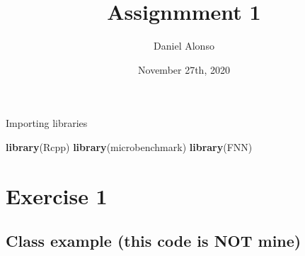 \documentclass[]{article}
\title{Assignmment 1}
\author{Daniel Alonso}
\date{November 27th, 2020}
\newenvironment{Shaded}{\begin{snugshade}}{\end{snugshade}}
\newcommand{\KeywordTok}[1]{\textcolor[rgb]{0.13,0.29,0.53}{\textbf{#1}}}
\newcommand{\NormalTok}[1]{#1}
\begin{document}
\maketitle

Importing libraries

\begin{Shaded}
\begin{Highlighting}[]
\KeywordTok{library}\NormalTok{(Rcpp)}
\KeywordTok{library}\NormalTok{(microbenchmark)}
\KeywordTok{library}\NormalTok{(FNN)}
\end{Highlighting}
\end{Shaded}

\hypertarget{exercise-1}{%
\section{Exercise 1}\label{exercise-1}}

\hypertarget{class-example-this-code-is-not-mine}{%
\subsection{Class example (this code is NOT
mine)}\label{class-example-this-code-is-not-mine}}
\end{document}
